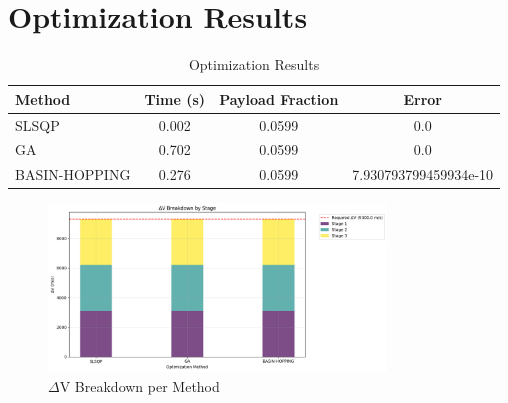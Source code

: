 \documentclass{article}
\begin{document}
\section{Optimization Results}
\begin{table}[h]
\centering
\begin{tabular}{|l|c|c|c|}
\hline
Method & Time (s) & Payload Fraction & Error \\
\hline
SLSQP & 0.002 & 0.0599 & 0.0 \\
GA & 0.702 & 0.0599 & 0.0 \\
BASIN-HOPPING & 0.276 & 0.0599 & 7.930793799459934e-10 \\
\hline
\end{tabular}
\caption{Optimization Results}
\end{table}
\begin{figure}[h]
\centering
\includegraphics[width=0.8\textwidth]{dv_breakdown.png}
\caption{$\Delta$V Breakdown per Method}
\end{figure}
\end{document}
